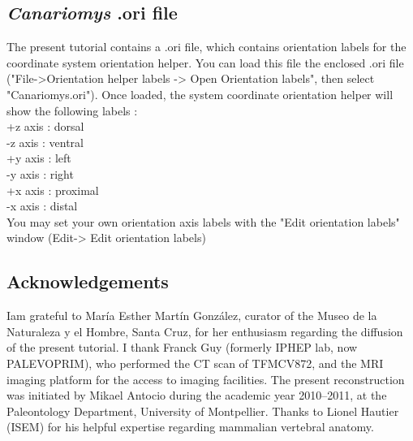 \documentclass[12pt, a4paper]{book}
\begin{document}
\subsection{\textit{Canariomys} .ori file}
The present tutorial contains a .ori file, which contains orientation labels for the coordinate system
orientation helper. You can load this file the enclosed .ori file ("File->Orientation helper labels -> Open Orientation labels", then select
"Canariomys.ori"). Once loaded, the system coordinate orientation helper will show the following
labels :\\
+z axis : dorsal\\
-z axis : ventral\\
+y axis : left\\
-y axis : right\\
+x axis : proximal\\
-x axis : distal\\
You may set your own orientation axis labels with the "Edit orientation labels" window (Edit-> Edit orientation labels)

\subsection{Acknowledgements}
Iam grateful to María Esther Martín González, curator of the Museo de la Naturaleza y el Hombre,
Santa Cruz, for her enthusiasm regarding the diffusion of the present tutorial. I thank Franck Guy
(formerly IPHEP lab, now PALEVOPRIM), who performed the CT scan of TFMCV872, and the MRI imaging platform for the access to
imaging facilities. The present reconstruction was initiated by Mikael Antocio during the academic
year 2010–2011, at the Paleontology Department, University of Montpellier. Thanks to Lionel Hautier
(ISEM) for his helpful expertise regarding mammalian vertebral anatomy. 



 		
\end{document}
